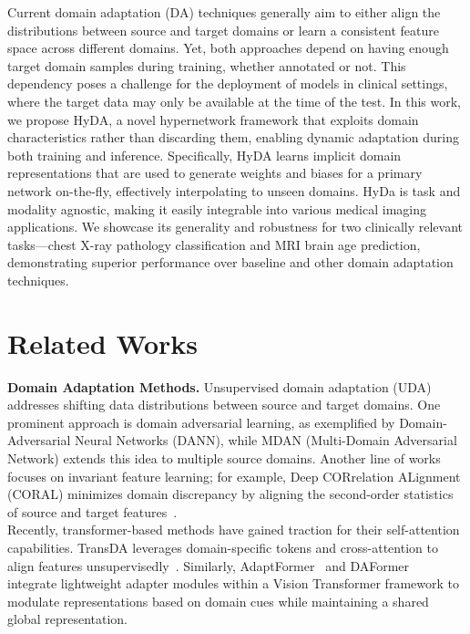 \documentclass[runningheads]{llncs}
\begin{document}
Current domain adaptation (DA) techniques generally aim to either align the distributions between source and target domains or learn a consistent feature space across different domains. Yet, both approaches depend on having enough target domain samples during training, whether annotated or not. This dependency poses a challenge for the deployment of models in clinical settings, where the target data may only be available at the time of the test. 
In this work, we propose HyDA, a novel hypernetwork framework that exploits domain characteristics rather than discarding them, enabling dynamic adaptation during both training and inference. Specifically, HyDA learns implicit domain representations that are used to generate weights and biases for a primary network on-the-fly, effectively interpolating to unseen domains.
HyDa is task and modality agnostic, making it easily integrable into various medical imaging applications. We showcase its generality and robustness for two clinically relevant tasks—chest X-ray pathology classification and MRI brain age prediction, demonstrating superior performance over baseline and other domain adaptation techniques.  

\section{Related Works}
\textbf{Domain Adaptation Methods.} Unsupervised domain adaptation (UDA) addresses shifting data distributions between source and target domains. One prominent approach is domain adversarial learning, as exemplified by Domain-Adversarial Neural Networks (DANN)\cite{Ganin-uda-dann-2016}, while MDAN (Multi-Domain Adversarial Network) extends this idea to multiple source domains\cite{Zhao-uda-mdan-2018}. Another line of works focuses on invariant feature learning; for example, Deep CORrelation ALignment (CORAL) minimizes domain discrepancy by aligning the second-order statistics of source and target features~\cite{sun2016deep}. \\
Recently, transformer-based methods have gained traction for their self-attention capabilities. TransDA leverages domain-specific tokens and cross-attention to align features unsupervisedly~\cite{yang2021transformer}. Similarly, AdaptFormer~\cite{chen2022adaptformer} and DAFormer~\cite{hoyer2022daformer} integrate lightweight adapter modules within a Vision Transformer framework to modulate representations based on domain cues while maintaining a shared global representation.
\end{document}
